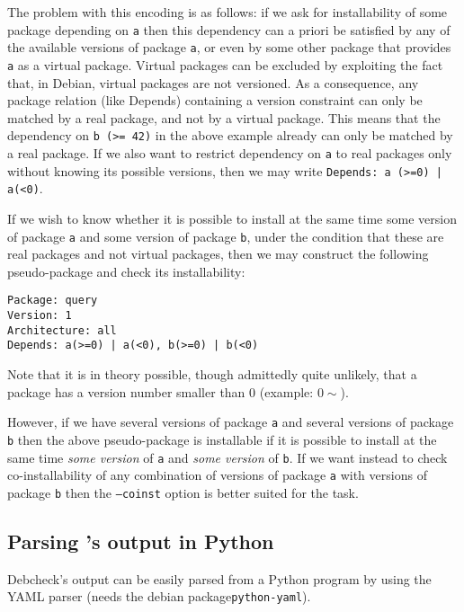The problem with this encoding is as follows: if we ask \debcheck{}
for installability of some package depending on \texttt{a} then this
dependency can a priori be satisfied by any of the available versions
of package \texttt{a}, or even by some other package that provides
\texttt{a} as a virtual package. Virtual packages can be excluded by
exploiting the fact that, in Debian, virtual packages are not
versioned. As a consequence, any package relation (like Depends)
containing a version constraint can only be matched by a real package,
and not by a virtual package. This means that the dependency on
\texttt{b (>= 42)} in the above example already can only be matched by
a real package. If we also want to restrict dependency on \texttt{a}
to real packages only without knowing its possible versions, then we
may write \texttt{Depends: a (>=0) | a(<0)}.

\begin{example}
  If we wish to know whether it is possible to install at the same
  time some version of package \texttt{a} and some version of package
  \texttt{b}, under the condition that these are real packages and not
  virtual packages, then we may construct the following pseudo-package
  and check its installability:
\begin{verbatim}
Package: query
Version: 1
Architecture: all
Depends: a(>=0) | a(<0), b(>=0) | b(<0)
\end{verbatim}
\end{example}

Note that it is in theory possible, though admittedly quite unlikely,
that a package has a version number smaller than $0$ (example:
$0\sim$).

However, if we have several versions of package \texttt{a} and several
versions of package \texttt{b} then the above pseudo-package is
installable if it is possible to install at the same time \emph{some
  version} of \texttt{a} and \emph{some version} of \texttt{b}. If we
want instead to check co-installability of any combination of versions
of package \texttt{a} with versions of package \texttt{b} then the
\texttt{--coinst} option is better suited for the task.

\subsection{Parsing \debcheck's output in Python}
Debcheck's output can be easily parsed from a Python program by using
the YAML parser (needs the debian package\texttt{python-yaml}).

